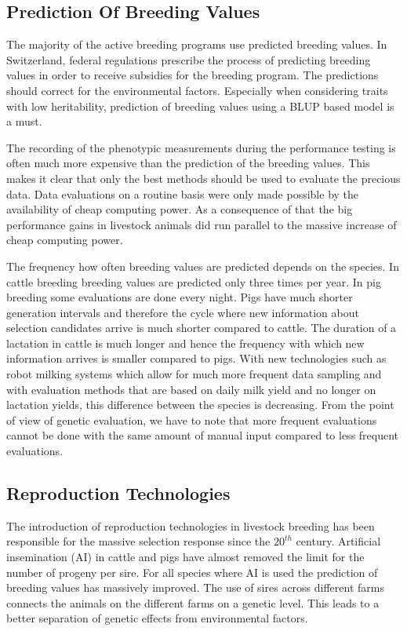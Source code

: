 \documentclass[
]{book}
\begin{document}
\hypertarget{gel-bprog-predbv}{%
\subsection{Prediction Of Breeding Values}\label{gel-bprog-predbv}}

The majority of the active breeding programs use predicted breeding values. In Switzerland, federal regulations prescribe the process of predicting breeding values in order to receive subsidies for the breeding program. The predictions should correct for the environmental factors. Especially when considering traits with low heritability, prediction of breeding values using a BLUP based model is a must.

The recording of the phenotypic measurements during the performance testing is often much more expensive than the prediction of the breeding values. This makes it clear that only the best methods should be used to evaluate the precious data. Data evaluations on a routine basis were only made possible by the availability of cheap computing power. As a consequence of that the big performance gains in livestock animals did run parallel to the massive increase of cheap computing power.

The frequency how often breeding values are predicted depends on the species. In cattle breeding breeding values are predicted only three times per year. In pig breeding some evaluations are done every night. Pigs have much shorter generation intervals and therefore the cycle where new information about selection candidates arrive is much shorter compared to cattle. The duration of a lactation in cattle is much longer and hence the frequency with which new information arrives is smaller compared to pigs. With new technologies such as robot milking systems which allow for much more frequent data sampling and with evaluation methods that are based on daily milk yield and no longer on lactation yields, this difference between the species is decreasing. From the point of view of genetic evaluation, we have to note that more frequent evaluations cannot be done with the same amount of manual input compared to less frequent evaluations.

\hypertarget{gel-bprog-reprotech}{%
\subsection{Reproduction Technologies}\label{gel-bprog-reprotech}}

The introduction of reproduction technologies in livestock breeding has been responsible for the massive selection response since the \(20^{th}\) century. Artificial insemination (AI) in cattle and pigs have almost removed the limit for the number of progeny per sire. For all species where AI is used the prediction of breeding values has massively improved. The use of sires across different farms connects the animals on the different farms on a genetic level. This leads to a better separation of genetic effects from environmental factors.
\end{document}

